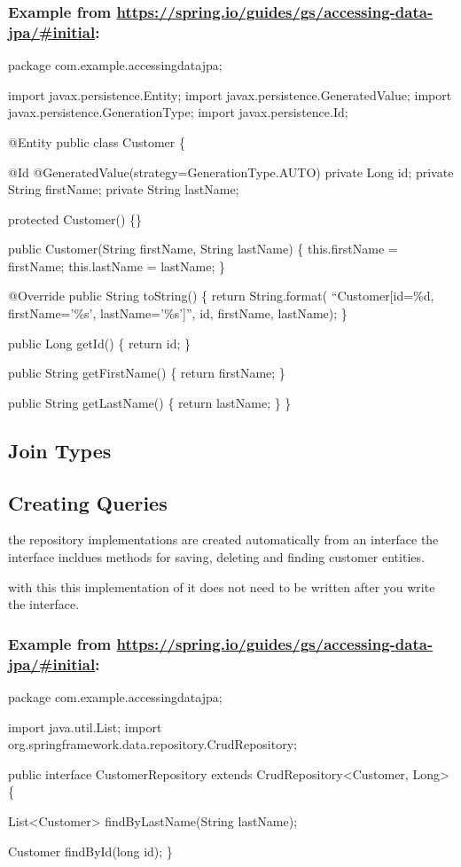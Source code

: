\documentclass[11pt]{article}
\begin{document}
\subsubsection{Example from \url{https://spring.io/guides/gs/accessing-data-jpa/\#initial}:}
\label{sec:org006c3de}
\begin{java}
package com.example.accessingdatajpa;

import javax.persistence.Entity;
import javax.persistence.GeneratedValue;
import javax.persistence.GenerationType;
import javax.persistence.Id;

@Entity
public class Customer \{

@Id
@GeneratedValue(strategy=GenerationType.AUTO)
private Long id;
private String firstName;
private String lastName;

protected Customer() \{\}

public Customer(String firstName, String lastName) \{
  this.firstName = firstName;
  this.lastName = lastName;
\}

@Override
public String toString() \{
  return String.format(
      ``Customer[id=\%d, firstName='\%s', lastName='\%s']'',
      id, firstName, lastName);
\}

public Long getId() \{
  return id;
\}

public String getFirstName() \{
  return firstName;
\}

  public String getLastName() \{
    return lastName;
  \}
\}
\end{java}

\subsection{Join Types}
\label{sec:orgbb7d2be}
\subsection{Creating Queries}
\label{sec:org04ccee3}
the repository implementations are created automatically from an interface
the interface incldues methods for saving, deleting and finding customer entities.

with this this implementation of it does not need to be written after you write the interface.

\subsubsection{Example from \url{https://spring.io/guides/gs/accessing-data-jpa/\#initial}:}
\label{sec:org03f7b84}
\begin{java}
package com.example.accessingdatajpa;

import java.util.List;
import org.springframework.data.repository.CrudRepository;

public interface CustomerRepository extends CrudRepository<Customer, Long> \{

List<Customer> findByLastName(String lastName);

  Customer findById(long id);
\}
\end{java}
\end{document}
